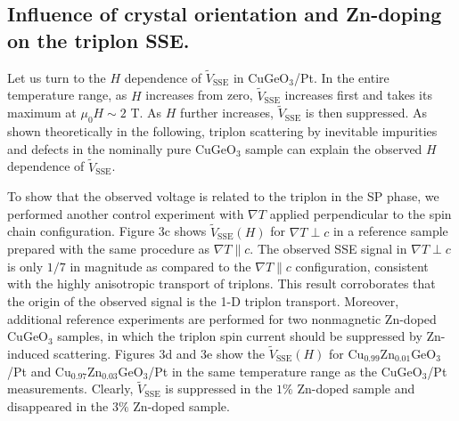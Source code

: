 \documentclass{nature}
\begin{document}
\subsection{Influence of crystal orientation and Zn-doping on the triplon SSE.}  
Let us turn to the $H$ dependence of $\tilde{V}_{\mathrm{SSE}}$ in CuGeO$_3$/Pt.
In the entire temperature range, as $H$ increases from zero, $\tilde{V}_{\mathrm{SSE}}$ increases first and takes its maximum at $\mu_0H \sim  2 $ T. 
As $H$ further increases, $\tilde{V}_{\mathrm{SSE}}$ is then suppressed.
As shown theoretically in the following, triplon scattering by inevitable impurities and defects in the nominally pure CuGeO$_3$ sample can explain the observed $H$ dependence of $\tilde{V}_{\mathrm{SSE}}$.

\par 
  
To show that the observed voltage is related to the triplon in the SP phase, we performed another control experiment with $\nabla T$ applied perpendicular to the spin chain configuration.
Figure 3c shows $\tilde{V}_{\mathrm{SSE}}(H)$ for $\nabla T \perp c$ in a reference sample prepared with the same procedure as $\nabla T \parallel c$. 
The observed SSE signal in $\nabla T \perp c$ 
is only $1/7$ in magnitude as compared to the $\nabla T \parallel c$ configuration, consistent 
with the highly anisotropic transport of triplons. This result corroborates that the origin of the observed signal is the 1-D triplon transport. Moreover, 
additional reference experiments are performed for two nonmagnetic Zn-doped CuGeO$_3$ samples, 
in which the triplon spin current should be suppressed by Zn-induced scattering.
Figures 3d and 3e show the $\tilde{V}_{\mathrm{SSE}}(H)$ for Cu$_{0.99}$Zn$_{0.01}$GeO$_3$/Pt and Cu$_{0.97}$Zn$_{0.03}$GeO$_3$/Pt in the same temperature range as the CuGeO$_3$/Pt measurements. 
Clearly, $\tilde{V}_{\mathrm{SSE}}$ is suppressed in the $1\%$ Zn-doped sample and disappeared in the $3\%$ Zn-doped sample.




\par 
\end{document}
